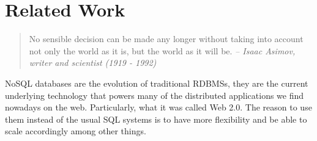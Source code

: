 
%
%

 

\chapter{Related Work}

\label{ch:relatedwork}

\begin{quotation}
No sensible decision can be made any longer without taking into account not only the world as it is, but the world as it will be.
{\small\it -- Isaac Asimov, writer and scientist (1919 - 1992)}
\end{quotation}

NoSQL databases are the evolution of traditional RDBMSs, they are the current underlying technology that powers many of the distributed applications we find nowadays on the web. Particularly, what it was called Web 2.0. The reason to use them instead of the usual SQL systems is to have more flexibility and be able to scale accordingly among other things.

